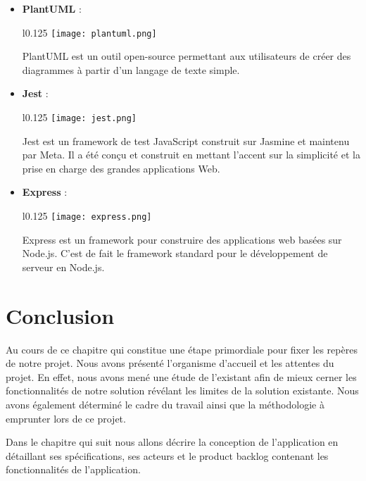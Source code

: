\begin{itemize}
    \item \textbf{PlantUML} :\\
    \begin{minipage}{\linewidth}
      \begin{wrapfigure}{l}{0.125\textwidth}
        \vspace{-0.5cm}
        \texttt{[image: plantuml.png]} 
      \end{wrapfigure}
      PlantUML est un outil open-source permettant aux utilisateurs de créer des diagrammes à partir d'un langage de texte simple. \cite{plantuml}
    \end{minipage}

    \item \textbf{Jest} :\\
    \begin{minipage}{\linewidth}
      \begin{wrapfigure}{l}{0.125\textwidth}
        \vspace{-0.5cm}
        \texttt{[image: jest.png]} 
      \end{wrapfigure}
      Jest est un framework de test JavaScript construit sur Jasmine et maintenu par Meta. Il a été conçu et construit en mettant l'accent sur la simplicité et la prise en charge des grandes applications Web. \cite{jest}
    \end{minipage}
  
    \vspace{0.5cm}
    \item \textbf{Express} :\\
    \begin{minipage}{\linewidth}
      \begin{wrapfigure}{l}{0.125\textwidth}
        \vspace{-0.5cm}
        \texttt{[image: express.png]}
      \end{wrapfigure}
      Express est un framework pour construire des applications web basées sur Node.js. C'est de fait le framework standard pour le développement de serveur en Node.js.  \cite{express}
    \end{minipage}

  
  \end{itemize}



\section*{Conclusion}
Au cours de ce chapitre qui constitue une étape primordiale pour fixer les repères de notre projet. Nous avons présenté l'organisme d'accueil et les attentes du projet. En effet, nous avons mené une étude de l'existant afin de mieux cerner les fonctionnalités de notre solution révélant les limites de la solution existante. Nous avons également déterminé le cadre du travail ainsi que la méthodologie à emprunter lors de ce projet.

Dans le chapitre qui suit nous allons décrire la conception de l'application en détaillant ses spécifications, ses acteurs et le product backlog contenant les fonctionnalités de l'application.

